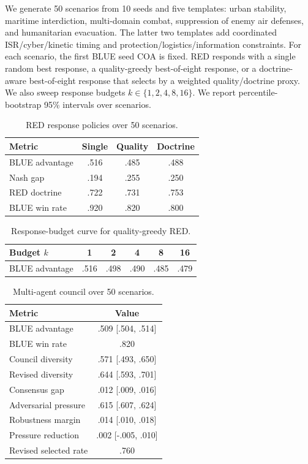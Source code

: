 \documentclass[letterpaper]{article}
\begin{document}
We generate 50 scenarios from 10 seeds and five templates: urban stability, maritime interdiction, multi-domain combat, suppression of enemy air defenses, and humanitarian evacuation. The latter two templates add coordinated ISR/cyber/kinetic timing and protection/logistics/information constraints. For each scenario, the first BLUE seed COA is fixed. RED responds with a single random best response, a quality-greedy best-of-eight response, or a doctrine-aware best-of-eight response that selects by a weighted quality/doctrine proxy. We also sweep response budgets $k \in \{1,2,4,8,16\}$. We report percentile-bootstrap 95\% intervals over scenarios.

\begin{table}[t]
\centering
\scriptsize
\caption{RED response policies over 50 scenarios.}
\label{tab:main}
\begin{tabular}{@{}lccc@{}}
\toprule
Metric & Single & Quality & Doctrine \\
\midrule
BLUE advantage & .516 & .485 & .488 \\
Nash gap & .194 & .255 & .250 \\
RED doctrine & .722 & .731 & .753 \\
BLUE win rate & .920 & .820 & .800 \\
\bottomrule
\end{tabular}
\end{table}

\begin{table}[t]
\centering
\scriptsize
\caption{Response-budget curve for quality-greedy RED.}
\label{tab:budget}
\begin{tabular}{@{}lccccc@{}}
\toprule
Budget $k$ & 1 & 2 & 4 & 8 & 16 \\
\midrule
BLUE advantage & .516 & .498 & .490 & .485 & .479 \\
\bottomrule
\end{tabular}
\end{table}

\begin{table}[t]
\centering
\scriptsize
\caption{Multi-agent council over 50 scenarios.}
\label{tab:council}
\begin{tabular}{@{}lc@{}}
\toprule
Metric & Value \\
\midrule
BLUE advantage & .509 [.504, .514] \\
BLUE win rate & .820 \\
Council diversity & .571 [.493, .650] \\
Revised diversity & .644 [.593, .701] \\
Consensus gap & .012 [.009, .016] \\
Adversarial pressure & .615 [.607, .624] \\
Robustness margin & .014 [.010, .018] \\
Pressure reduction & .002 [-.005, .010] \\
Revised selected rate & .760 \\
\bottomrule
\end{tabular}
\end{table}
\end{document}
